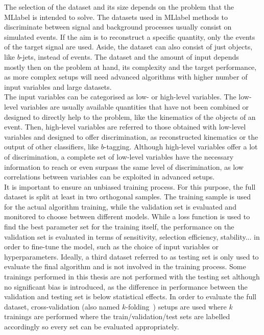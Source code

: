 The selection of the dataset and its size depends on the problem that the \acrshort{MLlabel} is intended to solve. The datasets used in \acrshort{MLlabel} methods to discriminate between signal and background processes usually consist on simulated events. If the aim is to reconstruct a specific quantity, only the events of the target signal are used. Aside, the dataset can also consist of just objects, like $b$-jets, instead of events. The dataset and the amount of input depends mostly then on the problem at hand, its complexity and the target performance, as more complex setups will need advanced algorithms with higher number of input variables and large datasets.\\

The input variables can be categorised as low- or high-level variables. The low-level variables are usually available quantities that have not been combined or designed to directly help to the problem, like the kinematics of the objects of an event. Then, high-level variables are referred to those obtained with low-level variables and designed to offer discrimination, as reconstructed kinematics or the output of other classifiers, like $b$-tagging. Although high-level variables offer a lot of discrimination, a complete set of low-level variables have the necessary information to reach or even surpass the same level of discrimination, as low correlations between variables can be exploited in advanced setups.\\

It is important to ensure an unbiased training process. For this purpose, the full dataset is split at least in two orthogonal samples. The training sample is used for the actual algorithm training, while the validation set is evaluated and monitored to choose between different models. While a loss function is used to find the best parameter set for the training itself, the performance on the validation set is evaluated in terms of sensitivity, selection efficiency, stability... in order to fine-tune the model, such as the choice of input variables or hyperparameters. Ideally, a third dataset referred to as testing set is only used to evaluate the final algorithm and is not involved in the training process. Some trainings performed in this thesis are not performed with the testing set although no significant bias is introduced, as the difference in performance between the validation and testing set is below statistical effects. In order to evaluate the full dataset, cross-validation (also named $k$-folding~\cite{EncyclopediaofML}) setups are used where $k$ trainings are performed where the train/validation/test sets are labelled accordingly so every set can be evaluated appropriately.\\

